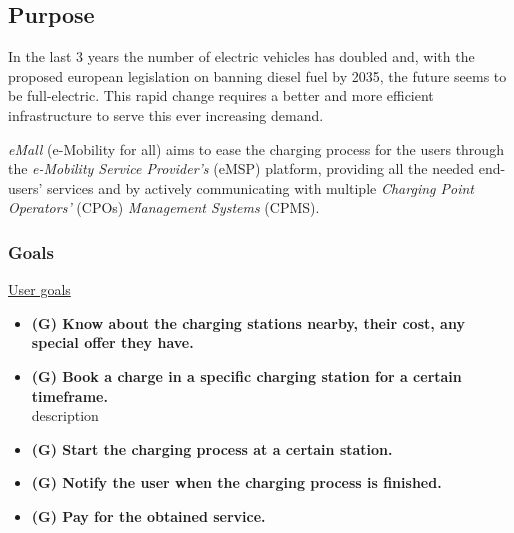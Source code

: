 \documentclass[table, 12pt]{article} %
\begin{document}
    \subsection{Purpose} %

         
        In the last 3 years the number of electric vehicles has doubled and, with the proposed european legislation on banning diesel fuel by 2035, the future seems to be full-electric. This rapid change requires a better and more efficient infrastructure to serve this ever increasing demand.

        

        \emph{eMall} (e-Mobility for all) aims to ease the charging process for the users through the \emph{e-Mobility Service Provider's} (eMSP) platform,
        providing all the needed end-users' services and by actively communicating with multiple \emph{Charging Point Operators'} (CPOs) \emph{Management Systems} (CPMS).   

    \subsubsection{Goals}
        \underline{User goals}
        \begin{itemize}
            \item  \textbf{(G) Know about the charging stations nearby, their cost, any special offer they have.}
            \item  \textbf{(G) Book a charge in a specific charging station for a certain timeframe.}\\ description
            \item  \textbf{(G) Start the charging process at a certain station.}
            \item  \textbf{(G) Notify the user when the charging process is finished.}
            \item  \textbf{(G) Pay for the obtained service.}
        \end{itemize}
\end{document}
